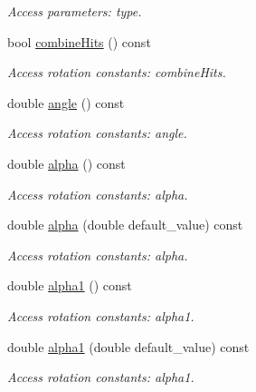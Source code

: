 \begin{DoxyCompactItemize}
\begin{DoxyCompactList}\small\item\em Access parameters: type. \item\end{DoxyCompactList}\item 
bool \hyperlink{struct_d_d4hep_1_1_x_m_l_1_1_dimension_a310d92cb90923f94c304fc42c3077fb0}{combineHits} () const 
\begin{DoxyCompactList}\small\item\em Access rotation constants: combineHits. \item\end{DoxyCompactList}\item 
double \hyperlink{struct_d_d4hep_1_1_x_m_l_1_1_dimension_a0918d748acba8a52e7e772501856a310}{angle} () const 
\begin{DoxyCompactList}\small\item\em Access rotation constants: angle. \item\end{DoxyCompactList}\item 
double \hyperlink{struct_d_d4hep_1_1_x_m_l_1_1_dimension_a41aad5c0a9e27d2c92b3097bf80b4a46}{alpha} () const 
\begin{DoxyCompactList}\small\item\em Access rotation constants: alpha. \item\end{DoxyCompactList}\item 
double \hyperlink{struct_d_d4hep_1_1_x_m_l_1_1_dimension_a9e86bf7a2672b84dd21107a5c5203bfe}{alpha} (double default\_\-value) const 
\begin{DoxyCompactList}\small\item\em Access rotation constants: alpha. \item\end{DoxyCompactList}\item 
double \hyperlink{struct_d_d4hep_1_1_x_m_l_1_1_dimension_acf345f7cc4e5467c9a9f09a41b434361}{alpha1} () const 
\begin{DoxyCompactList}\small\item\em Access rotation constants: alpha1. \item\end{DoxyCompactList}\item 
double \hyperlink{struct_d_d4hep_1_1_x_m_l_1_1_dimension_a597306d88616aa90ef5b3331f0941b3e}{alpha1} (double default\_\-value) const 
\begin{DoxyCompactList}\small\item\em Access rotation constants: alpha1. \item\end{DoxyCompactList}\item 

\end{DoxyCompactItemize}
